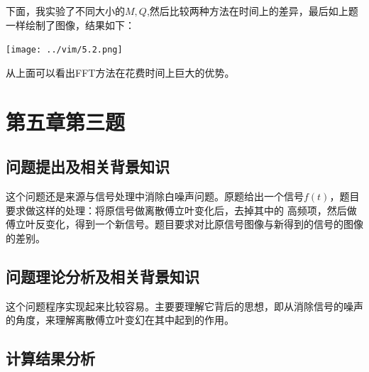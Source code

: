 \documentclass[10pt,a4paper]{ctexart}
\begin{document}
下面，我实验了不同大小的$M,Q$,然后比较两种方法在时间上的差异，最后如上题一样绘制了图像，结果如下：
\par
\centerline{\texttt{[image: ../vim/5.2.png]}}
\par
从上面可以看出FFT方法在花费时间上巨大的优势。
\section{第五章第三题}
\subsection{问题提出及相关背景知识}
这个问题还是来源与信号处理中消除白噪声问题。原题给出一个信号$f(t)$，题目要求做这样的处理：将原信号做离散傅立叶变化后，去掉其中的
高频项，然后做傅立叶反变化，得到一个新信号。题目要求对比原信号图像与新得到的信号的图像的差别。
\subsection{问题理论分析及相关背景知识}
这个问题程序实现起来比较容易。主要要理解它背后的思想，即从消除信号的噪声的角度，来理解离散傅立叶变幻在其中起到的作用。
\subsection{计算结果分析}
\end{document}
